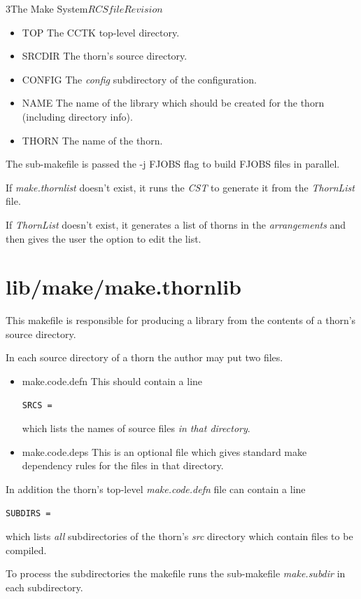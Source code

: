 \begin{cactuspart}{3}{The Make System}{$RCSfile$}{$Revision$}
\begin{itemize}
\item{TOP}
The CCTK top-level directory.
\item{SRCDIR}
The thorn's source directory.
\item{CONFIG}
The {\em config} subdirectory of the configuration. 
\item{NAME}
The name of the library which should be created for the thorn
(including directory info).
\item{THORN}
The name of the thorn.
\end{itemize}

The sub-makefile is passed the -j FJOBS flag to build FJOBS files in parallel.

If {\em make.thornlist} doesn't exist, it runs the {\em CST} to generate it from
the {\em ThornList} file.

If {\em ThornList} doesn't exist, it generates a list of thorns in the 
{\em arrangements} and then gives the user the option to edit the
list.

\section{lib/make/make.thornlib}
\label{sec:makefiles:thornlib}

This makefile is responsible for producing a library from the contents of a
thorn's source directory.

In each source directory of a thorn the author may put two files.

\begin{itemize}
\item{make.code.defn}
This should contain a line
\begin{verbatim}
SRCS = 
\end{verbatim}
which lists the names of source files {\em in that directory}.
\item{make.code.deps}
This is an optional file which gives standard make dependency rules
for the files in that directory.
\end{itemize}

In addition the thorn's top-level {\em make.code.defn} file can
contain a line
\begin{verbatim}
SUBDIRS = 
\end{verbatim}

which lists {\em all} subdirectories of the thorn's {\em src} directory which
contain files to be compiled.

To process the subdirectories the makefile runs the sub-makefile {\em make.subdir}
in each subdirectory. 


\end{cactuspart}
